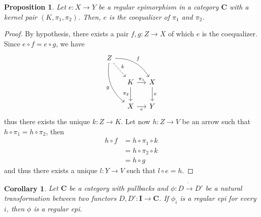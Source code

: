 \documentclass[runningheads,envcountsect]{llncs}
\newcommand{\cat}[1]{\ensuremath{\mathbf{#1}}}
\theoremstyle{plain}
\newtheorem{prop}[theorem]{Proposition}
\newtheorem{cor}[theorem]{Corollary}
\theoremstyle{definition}
\begin{document}
\begin{prop}\label{prop:reg_epi_coeq}
    Let $e: X \to Y$ be a regular epimorphism in a category $\cat C$ with a kernel pair $(K, \pi_1, \pi_2)$. Then, $e$ is the coequalizer of $\pi_1$ and $\pi_2$.
\end{prop}

\begin{proof}
    By hypothesis, there exists a pair $f, g: Z \to X$ of which $e$ is the coequalizer. Since $e \circ f = e \circ g$, we have
    \[
        \begin{tikzcd}[row sep= 20, column sep = 13]
            Z \ar[drr, "f", bend left=30] \ar[ddr, "g"swap, bend right=30] \ar[dr, dashed, "k"] & & \\
            & K \ar[r, "{\pi_1}"] \ar[d, "{\pi_2}" swap] & X \ar[d, "e"] \\
            & X \ar[r, "e"swap] & Y
        \end{tikzcd}
    \]
    thus there exists the unique $k: Z \to K$. Let now $h: Z \to V$ be an arrow such that $h \circ \pi_1 = h \circ \pi_2$, then
    \begin{align*}
        h \circ f &= h \circ \pi_1 \circ k \\
                  &= h \circ \pi_2 \circ k \\
                  &= h \circ g
    \end{align*}
    and thus there exists a unique $l: Y \to V$ such that $l \circ e = h$.
\end{proof}

\begin{cor}\label{cor:reg_epi_components_reg_epi_nat_trans}
    Let $\cat C$ be a category with pullbacks and $\phi : D \dot\to D'$ be a natural transformation between two functors $D, D': \cat{I \to C}$. If $\phi_i$ is a regular epi for every $i$, then $\phi$ is a regular epi.
\end{cor}
\end{document}
